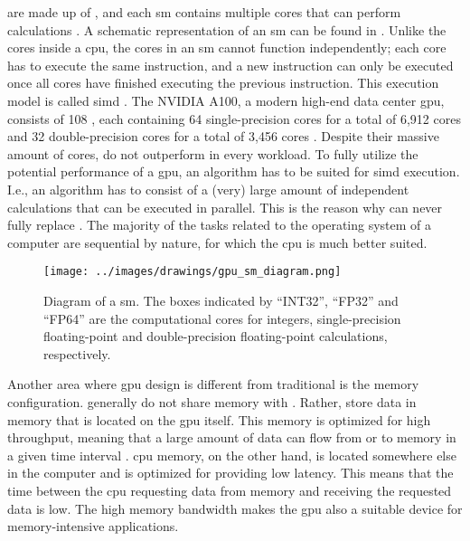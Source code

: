  are made up of , and each \acrshort{sm} contains multiple cores that can perform calculations \citep{rauberParallelProgrammingMulticore2023}. A schematic representation of an \acrshort{sm} can be found in . Unlike the cores inside a \acrshort{cpu}, the cores in an \acrshort{sm} cannot function independently; each core has to execute the same instruction, and a new instruction can only be executed once all cores have finished executing the previous instruction. This execution model is called \acrfull{simd} \citep{flynnVeryHighspeedComputing1966}. The NVIDIA A100, a modern high-end data center \acrshort{gpu}, consists of 108 , each containing 64 single-precision cores for a total of 6,912 cores and 32 double-precision cores for a total of 3,456 cores \citep{nvidiaNVIDIAA100Tensor2020}. Despite their massive amount of cores,  do not outperform  in every workload. To fully utilize the potential performance of a \acrshort{gpu}, an algorithm has to be suited for \acrshort{simd} execution. I.e., an algorithm has to consist of a (very) large amount of independent calculations that can be executed in parallel. This is the reason why  can never fully replace . The majority of the tasks related to the operating system of a computer are sequential by nature, for which the \acrshort{cpu} is much better suited.

\begin{figure}
    \centering
    \texttt{[image: ../images/drawings/gpu\_sm\_diagram.png]}
    \caption{Diagram of a \acrfull{sm}. The boxes indicated by ``INT32'', ``FP32'' and ``FP64'' are the computational cores for integers, single-precision floating-point and double-precision floating-point calculations, respectively. \citep{rauberParallelProgrammingMulticore2023}}
    \label{fig:gpu_sm_diagram}
\end{figure}

Another area where \acrshort{gpu} design is different from traditional  is the memory configuration.  generally do not share memory with . Rather,  store data in memory that is located on the \acrshort{gpu} itself. This memory is optimized for high throughput, meaning that a large amount of data can flow from or to memory in a given time interval \citep{aamondtGeneralPurposeGraphicsProcessing2018}. \acrshort{cpu} memory, on the other hand, is located somewhere else in the computer and is optimized for providing low latency. This means that the time between the \acrshort{cpu} requesting data from memory and receiving the requested data is low. The high memory bandwidth makes the \acrshort{gpu} also a suitable device for memory-intensive applications.

